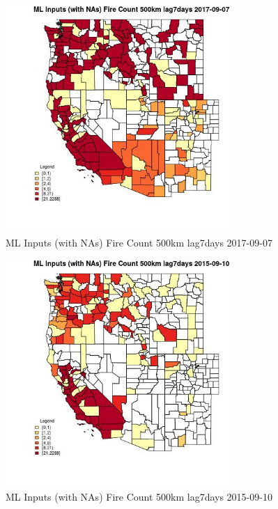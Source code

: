 \begin{figure} 
\centering  
\includegraphics[width=0.77\textwidth]{Code_Outputs/Report_ML_input_PM25_Step4_part_e_de_duplicated_aves_compiled_2019-05-21wNAs_CountyFire_Count_500km_lag7daysMean2017-09-07.jpg} 
\caption{\label{fig:Report_ML_input_PM25_Step4_part_e_de_duplicated_aves_compiled_2019-05-21wNAsCountyFire_Count_500km_lag7daysMean2017-09-07}ML Inputs (with NAs) Fire Count 500km lag7days 2017-09-07} 
\end{figure} 
 

\begin{figure} 
\centering  
\includegraphics[width=0.77\textwidth]{Code_Outputs/Report_ML_input_PM25_Step4_part_e_de_duplicated_aves_compiled_2019-05-21wNAs_CountyFire_Count_500km_lag7daysMean2015-09-10.jpg} 
\caption{\label{fig:Report_ML_input_PM25_Step4_part_e_de_duplicated_aves_compiled_2019-05-21wNAsCountyFire_Count_500km_lag7daysMean2015-09-10}ML Inputs (with NAs) Fire Count 500km lag7days 2015-09-10} 
\end{figure} 
 

